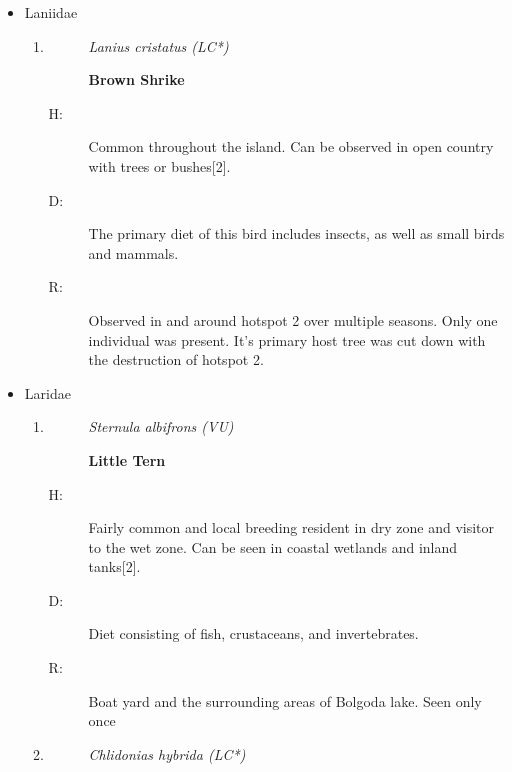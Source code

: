 \begin{itemize}
\begin{enumerate}
%
\end{enumerate}%
\item%
Laniidae%
\begin{enumerate}%
\item%
\begin{description}%
\item[]%
\textit{Lanius cristatus (LC*)}%
\item[]%
\textbf{Brown Shrike}%
\end{description}%
\begin{description}%
\item[H: ]%
Common throughout the island. Can be observed in open country with trees or bushes{[}2{]}.%
\item[D: ]%
The primary diet of this bird includes insects, as well as small birds and mammals.%
\item[R: ]%
Observed in and around hotspot 2 over multiple seasons. Only one individual was present. It's primary host tree was cut down with the destruction of hotspot 2.%
\end{description}%
\end{enumerate}%
\item%
Laridae%
\begin{enumerate}%
\item%
\begin{description}%
\item[]%
\textit{Sternula albifrons (VU)}%
\item[]%
\textbf{Little Tern}%
\end{description}%
\begin{description}%
\item[H: ]%
Fairly common and local breeding resident in dry zone and visitor to the wet zone. Can be seen in coastal wetlands and inland tanks{[}2{]}.%
\item[D: ]%
Diet consisting of fish, crustaceans, and invertebrates.%
\item[R: ]%
Boat yard and the surrounding areas of Bolgoda lake. Seen only once%
\end{description}%
\item%
\begin{description}%
\item[]%
\textit{Chlidonias hybrida (LC*)}%

\end{description}
\end{enumerate}
\end{itemize}
